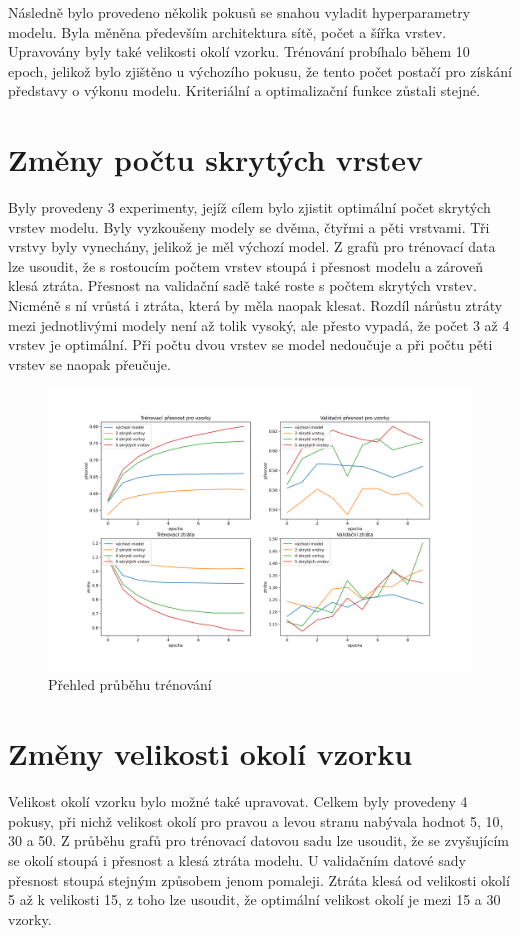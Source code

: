 \documentclass[FM,BP]{tulthesis}
\begin{document}
Následně bylo provedeno několik pokusů se snahou vyladit hyperparametry modelu. Byla měněna především architektura sítě, počet a šířka vrstev. Upravovány byly také velikosti okolí vzorku. Trénování probíhalo během 10 epoch, jelikož bylo zjištěno u výchozího pokusu, že tento počet postačí pro získání představy o výkonu modelu. Kriteriální a optimalizační funkce zůstali stejné.

\section{Změny počtu skrytých vrstev}
Byly provedeny 3 experimenty, jejíž cílem bylo zjistit optimální počet skrytých vrstev modelu. Byly vyzkoušeny modely se dvěma, čtyřmi a pěti vrstvami. Tři vrstvy byly vynechány, jelikož je měl výchozí model. Z grafů pro trénovací data lze usoudit, že s rostoucím počtem vrstev stoupá i přesnost modelu a zároveň klesá ztráta. Přesnost na validační sadě také roste s počtem skrytých vrstev. Nicméně s ní vrůstá i ztráta, která by měla naopak klesat. Rozdíl nárůstu ztráty mezi jednotlivými modely není až tolik vysoký, ale přesto vypadá, že počet 3 až 4 vrstev je optimální. Při počtu dvou vrstev se model nedoučuje a při počtu pěti vrstev se naopak přeučuje.

\begin{figure}[!htbp]
\centerline{\includegraphics[scale=.5]{prubeh_trenovani_sekce_vsrtvy.png}}
\caption{Přehled průběhu trénování}
\label{fig}
\end{figure}
\FloatBarrier

\section{Změny velikosti okolí vzorku}
Velikost okolí vzorku bylo možné také upravovat. Celkem byly provedeny 4 pokusy, při nichž velikost okolí pro pravou a levou stranu nabývala hodnot 5, 10, 30 a 50. Z průběhu grafů pro trénovací datovou sadu lze usoudit, že se zvyšujícím se okolí stoupá i přesnost a klesá ztráta modelu. U validačním datové sady přesnost stoupá stejným způsobem jenom pomaleji. Ztráta klesá od velikosti okolí 5 až k velikosti 15, z toho lze usoudit, že optimální velikost okolí je mezi 15 a 30 vzorky.
\end{document}
